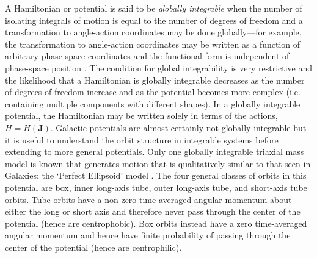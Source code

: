 \documentclass[letterpaper,12pt,preprint]{aastex}
\newcommand{\chchchanges}[1]{{\color{red} {#1}}}
\begin{document}
A Hamiltonian or potential is said to be \emph{globally integrable} when the number of isolating integrals of motion is equal to the number of degrees of freedom and a transformation to angle-action coordinates may be done globally---for example, the transformation to angle-action coordinates may be written as a function of arbitrary phase-space coordinates and the functional form is independent of phase-space position \citep[e.g.,][]{goldstein80}. The condition for global integrability is very restrictive and the likelihood that a Hamiltonian is globally integrable decreases as the number of degrees of freedom increase \citep[e.g.,][]{lichtenberg83} and as the potential becomes more complex (i.e. containing multiple components with different shapes). In a globally integrable potential, the Hamiltonian may be written solely in terms of the actions, $H = H(\boldsymbol{J})$. Galactic potentials are almost certainly not globally integrable but it is useful to understand the orbit structure in integrable systems before extending to more general potentials. Only one globally integrable triaxial mass model is known that generates motion that is qualitatively similar to that seen in Galaxies: \chchchanges{the `Perfect Ellipsoid' model \citep[a special case of the St\"ackel model; see, e.g.,][]{kuzmin73, deZeeuw85}}. The four general classes of orbits in this potential are box, inner long-axis tube, outer long-axis tube, and short-axis tube orbits. \chchchanges{Tube orbits have a non-zero time-averaged angular momentum about either the long or short axis and therefore never pass through the center of the potential (hence are centrophobic). Box orbits instead have a zero time-averaged angular momentum and hence have finite probability of passing through the center of the potential (hence are centrophilic).}
\end{document}
